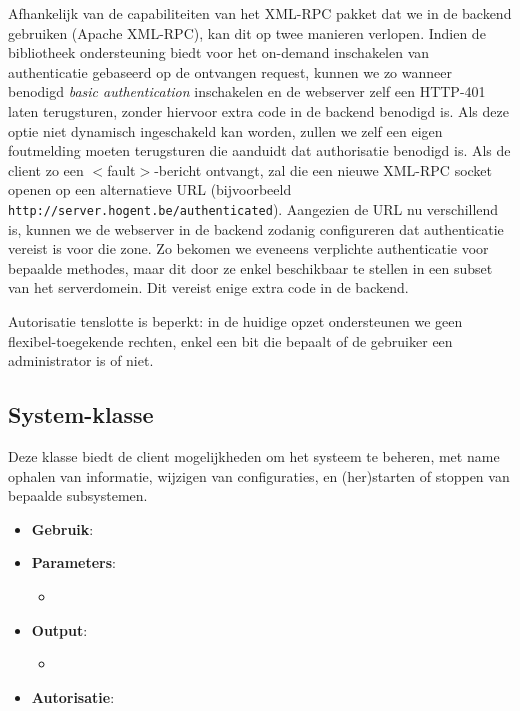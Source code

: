 Afhankelijk van de capabiliteiten van het XML-RPC pakket dat we in de backend gebruiken (Apache XML-RPC), kan dit op twee manieren verlopen. Indien de bibliotheek ondersteuning biedt voor het on-demand inschakelen van authenticatie gebaseerd op de ontvangen request, kunnen we zo wanneer benodigd \emph{basic authentication} inschakelen en de webserver zelf een HTTP-401 laten terugsturen, zonder hiervoor extra code in de backend benodigd is.
Als deze optie niet dynamisch ingeschakeld kan worden, zullen we zelf een eigen foutmelding moeten terugsturen die aanduidt dat authorisatie benodigd is. Als de client zo een $<$fault$>$-bericht ontvangt, zal die een nieuwe XML-RPC socket openen op een alternatieve URL (bijvoorbeeld \texttt{http://server.hogent.be/authenticated}). Aangezien de URL nu verschillend is, kunnen we de webserver in de backend zodanig configureren dat authenticatie vereist is voor die zone. Zo bekomen we eveneens verplichte authenticatie voor bepaalde methodes, maar dit door ze enkel beschikbaar te stellen in een subset van het serverdomein. Dit vereist enige extra code in de backend.

Autorisatie tenslotte is beperkt: in de huidige opzet ondersteunen we geen flexibel-toegekende rechten, enkel een bit die bepaalt of de gebruiker een administrator is of niet.


\subsection{System-klasse}

Deze klasse biedt de client mogelijkheden om het systeem te beheren, met name ophalen van informatie, wijzigen van configuraties, en (her)starten of stoppen van bepaalde subsystemen.


\begin{itemize}
\item{\textbf{Gebruik}: }
\item{\textbf{Parameters}:}
	\begin{itemize}
	\item{}
	\end{itemize}
\item{\textbf{Output}:}
	\begin{itemize}
	\item{}
	\end{itemize}
\item{\textbf{Autorisatie}: }
\end{itemize}

